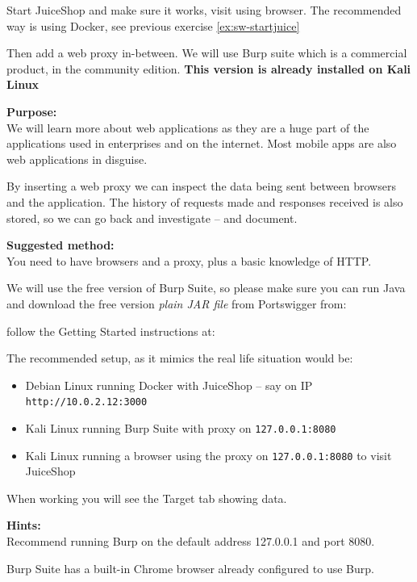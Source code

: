 \documentclass[a4paper,11pt,notitlepage]{report}
\begin{document}
Start JuiceShop and make sure it works, visit using browser. The recommended way is using Docker, see previous exercise \ref{ex:sw-startjuice}

Then add a web proxy in-between. We will use Burp suite which is a commercial product, in the community edition. {\bf This version is already installed on Kali Linux}

{\bf Purpose:}\\
We will learn more about web applications as they are a huge part of the applications used in enterprises and on the internet. Most mobile apps are also web applications in disguise.

By inserting a web proxy we can inspect the data being sent between browsers and the application. The history of requests made and responses received is also stored, so we can go back and investigate -- and document.

{\bf Suggested method:}\\
You need to have browsers and a proxy, plus a basic knowledge of HTTP.

We will use the free version of Burp Suite, so please make sure you can run Java and
download the free version \emph{plain JAR file} from Portswigger from:


follow the Getting Started instructions at:\\
{\footnotesize{}}

The recommended setup, as it mimics the real life situation would be:
\begin{itemize}
\item Debian Linux running Docker with JuiceShop -- say on IP \verb+http://10.0.2.12:3000+
\item Kali Linux running Burp Suite with proxy on \verb+127.0.0.1:8080+
\item Kali Linux running a browser using the proxy on \verb+127.0.0.1:8080+ to visit JuiceShop
\end{itemize}

When working you will see the Target tab showing data.

{\bf Hints:}\\
Recommend running Burp on the default address 127.0.0.1 and port 8080.

Burp Suite has a built-in Chrome browser already configured to use Burp.
\end{document}
